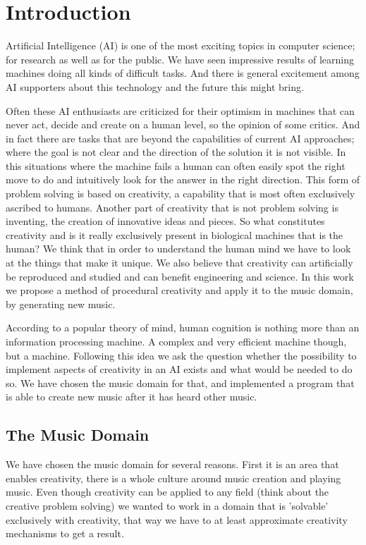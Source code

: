 \section{Introduction} 
Artificial Intelligence (AI) is one of the most exciting topics in computer science; for research as well as for the public. We have seen impressive results of learning machines doing all kinds of difficult tasks. And there is general excitement among AI supporters about this technology and the future this might bring. 

Often these AI enthusiasts are criticized for their optimism in machines that can never act, decide and create on a human level, so the opinion of some critics. And in fact there are tasks that are beyond the capabilities of current AI approaches; where the goal is not clear and the direction of the solution it is not visible. In this situations where the machine fails a human can often easily spot the right move to do and intuitively look for the answer in the right direction. This form of problem solving is based on creativity, a capability that is most often exclusively ascribed to humans. Another part of creativity that is not problem solving is inventing, the creation of innovative ideas and pieces. So what constitutes creativity and is it really exclusively present in biological machines that is the human? We think that in order to understand the human mind we have to look at the things that make it unique. We also believe that creativity can artificially be reproduced and studied and can benefit engineering and science. In this work we propose a method of procedural creativity and apply it to the music domain, by generating new music.

According to a popular theory of mind, human cognition is nothing more than an information processing machine. A complex and very efficient machine though, but a machine. Following this idea we ask the question whether the possibility to implement aspects of creativity in an AI exists and what would be needed to do so. We have chosen the music domain for that, and implemented a program that is able to create new music after it has heard other music.

\subsection{The Music Domain}
We have chosen the music domain for several reasons. First it is an area that enables creativity, there is a whole culture around music creation and playing music. Even though creativity can be applied to any field (think about the creative problem solving) we wanted to work in a domain that is 'solvable' exclusively with creativity, that way we have to at least approximate creativity mechanisms to get a result.

